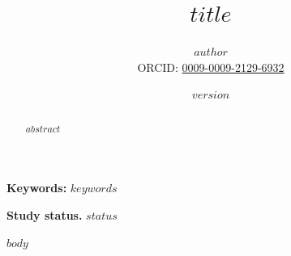 \documentclass[10pt]{article}
\title{\vspace{-1.5em}\Large\bfseries $title$}
\author{\normalsize $author$\\[-2pt]\small ORCID: \href{https://orcid.org/0009-0009-2129-6932}{0009-0009-2129-6932}}
\date{\small $version$}
\begin{document}
\maketitle
\thispagestyle{fancy}
\vspace{-1.4em}
\begin{abstract}
\noindent $abstract$
\end{abstract}
\noindent\textbf{Keywords:} $keywords$

\smallskip
{\small\textbf{Study status.} $status$\par}
$body$
\end{document}
